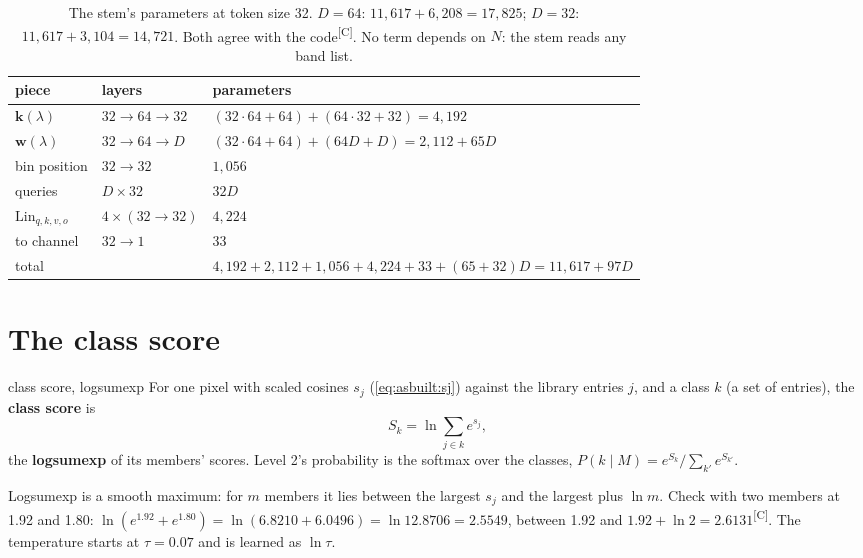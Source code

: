 \documentclass[11pt,a4paper,oneside,openany]{book}
\newcommand{\B}[1]{{\symbf{#1}}}
\newcommand{\B}[1]{{\bm{#1}}}
\newcommand{\comp}{\textsuperscript{\textsf{\scriptsize[C]}}}
\newcommand{\vw}{\B{w}}
\begin{document}
\begin{table}[htbp]
\centering\small
\begin{tabular}{@{}lll@{}}
\toprule
piece & layers & parameters\\
\midrule
$\B{k}(\lambda)$ & $32\to64\to32$ & $(32\cdot64+64)+(64\cdot32+32)=4{,}192$\\
$\vw(\lambda)$ & $32\to64\to D$ & $(32\cdot64+64)+(64D+D)=2{,}112+65D$\\
bin position & $32\to32$ & $1{,}056$\\
queries & $D\times32$ & $32D$\\
$\mathrm{Lin}_{q,k,v,o}$ & $4\times(32\to32)$ & $4{,}224$\\
to channel & $32\to1$ & $33$\\
\midrule
total & & $4{,}192+2{,}112+1{,}056+4{,}224+33+(65+32)D=11{,}617+97D$\\
\bottomrule
\end{tabular}
\caption{The stem's parameters at token size 32. $D=64$: $11{,}617+6{,}208=17{,}825$; $D=32$: $11{,}617+3{,}104=14{,}721$. Both agree with the code\comp. No term depends on
$N$: the stem reads any band list.}
\label{tab:asbuilt:stem}
\end{table}

\section{The class score}

\begin{defn}{class score, logsumexp}
For one pixel with scaled cosines $s_j$ (\cref{eq:asbuilt:sj}) against the library entries $j$, and a class $k$ (a set of entries), the \textbf{class score}
is
\[
  S_k=\ln\sum_{j\in k}e^{s_j},
\]
the \textbf{logsumexp} of its members' scores. Level 2's probability is the softmax over the classes, $P(k\mid M)=e^{S_k}/\sum_{k'}e^{S_{k'}}$.
\end{defn}

Logsumexp is a smooth maximum: for $m$ members it lies between the largest $s_j$ and the largest plus $\ln m$. Check with two members at 1.92 and 1.80:
$\ln(e^{1.92}+e^{1.80})=\ln(6.8210+6.0496)=\ln12.8706=2.5549$, between 1.92 and $1.92+\ln2=2.6131$\comp. The temperature starts at $\tau=0.07$ and is learned as $\ln\tau$.
\end{document}
